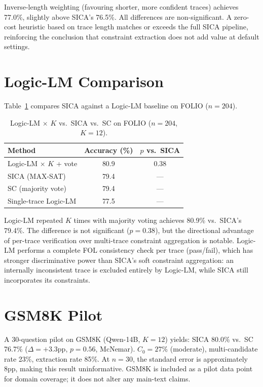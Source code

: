 \documentclass[11pt]{article}
\begin{document}
Inverse-length weighting (favouring shorter, more confident traces) achieves 77.0\%, slightly above SICA's 76.5\%.
All differences are non-significant.
A zero-cost heuristic based on trace length matches or exceeds the full SICA pipeline, reinforcing the conclusion that constraint extraction does not add value at default settings.

\section{Logic-LM Comparison}
\label{app:logiclm}

Table~\ref{tab:logiclm} compares SICA against a Logic-LM baseline on FOLIO ($n{=}204$).

\begin{table}[h]
\centering
\caption{Logic-LM $\times$ $K$ vs.\ SICA vs.\ SC on FOLIO ($n{=}204$, $K{=}12$).}
\label{tab:logiclm}
\small
\begin{tabular}{@{}lcc@{}}
\toprule
Method & Accuracy (\%) & $p$ vs.\ SICA \\
\midrule
Logic-LM $\times$ $K$ + vote & 80.9 & 0.38 \\
SICA (MAX-SAT) & 79.4 & --- \\
SC (majority vote) & 79.4 & --- \\
Single-trace Logic-LM & 77.5 & --- \\
\bottomrule
\end{tabular}
\end{table}

Logic-LM repeated $K$ times with majority voting achieves 80.9\% vs.\ SICA's 79.4\%.
The difference is not significant ($p{=}0.38$), but the directional advantage of per-trace verification over multi-trace constraint aggregation is notable.
Logic-LM performs a complete FOL consistency check per trace (pass/fail), which has stronger discriminative power than SICA's soft constraint aggregation: an internally inconsistent trace is excluded entirely by Logic-LM, while SICA still incorporates its constraints.

\section{GSM8K Pilot}
\label{app:gsm8k}

A 30-question pilot on GSM8K (Qwen-14B, $K{=}12$) yields: SICA 80.0\% vs.\ SC 76.7\% ($\Delta{=}+3.3$pp, $p{=}0.56$, McNemar).
$C_0{=}27\%$ (moderate), multi-candidate rate 23\%, extraction rate 85\%.
At $n{=}30$, the standard error is approximately 8pp, making this result uninformative.
GSM8K is included as a pilot data point for domain coverage; it does not alter any main-text claims.
\end{document}
